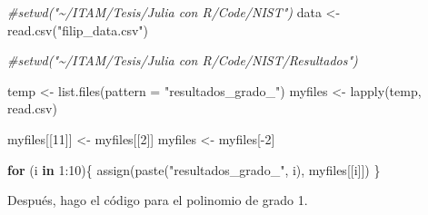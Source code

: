 \documentclass[
]{article}
\newenvironment{Shaded}{\begin{snugshade}}{\end{snugshade}}
\newcommand{\AttributeTok}[1]{\textcolor[rgb]{0.77,0.63,0.00}{#1}}
\newcommand{\CommentTok}[1]{\textcolor[rgb]{0.56,0.35,0.01}{\textit{#1}}}
\newcommand{\ConstantTok}[1]{\textcolor[rgb]{0.00,0.00,0.00}{#1}}
\newcommand{\ControlFlowTok}[1]{\textcolor[rgb]{0.13,0.29,0.53}{\textbf{#1}}}
\newcommand{\DecValTok}[1]{\textcolor[rgb]{0.00,0.00,0.81}{#1}}
\newcommand{\FunctionTok}[1]{\textcolor[rgb]{0.00,0.00,0.00}{#1}}
\newcommand{\NormalTok}[1]{#1}
\newcommand{\OtherTok}[1]{\textcolor[rgb]{0.56,0.35,0.01}{#1}}
\newcommand{\SpecialCharTok}[1]{\textcolor[rgb]{0.00,0.00,0.00}{#1}}
\newcommand{\StringTok}[1]{\textcolor[rgb]{0.31,0.60,0.02}{#1}}
\begin{document}
\begin{Shaded}
\begin{Highlighting}[]
\CommentTok{\#setwd("\textasciitilde{}/ITAM/Tesis/Julia con R/Code/NIST")}
\NormalTok{data }\OtherTok{\textless{}{-}} \FunctionTok{read.csv}\NormalTok{(}\StringTok{"filip\_data.csv"}\NormalTok{)}

\CommentTok{\#setwd("\textasciitilde{}/ITAM/Tesis/Julia con R/Code/NIST/Resultados")}

\NormalTok{temp }\OtherTok{\textless{}{-}} \FunctionTok{list.files}\NormalTok{(}\AttributeTok{pattern =} \StringTok{"resultados\_grado\_"}\NormalTok{)}
\NormalTok{myfiles }\OtherTok{\textless{}{-}} \FunctionTok{lapply}\NormalTok{(temp, read.csv)}

\NormalTok{myfiles[[}\DecValTok{11}\NormalTok{]] }\OtherTok{\textless{}{-}}\NormalTok{ myfiles[[}\DecValTok{2}\NormalTok{]]}
\NormalTok{myfiles }\OtherTok{\textless{}{-}}\NormalTok{ myfiles[}\SpecialCharTok{{-}}\DecValTok{2}\NormalTok{]}

\ControlFlowTok{for}\NormalTok{ (i }\ControlFlowTok{in} \DecValTok{1}\SpecialCharTok{:}\DecValTok{10}\NormalTok{)\{}
  \FunctionTok{assign}\NormalTok{(}\FunctionTok{paste}\NormalTok{(}\StringTok{"resultados\_grado\_"}\NormalTok{, i), myfiles[[i]])}
\NormalTok{\}}
\end{Highlighting}
\end{Shaded}

Después, hago el código para el polinomio de grado 1.

\begin{Shaded}
\end{Shaded}
\end{document}
